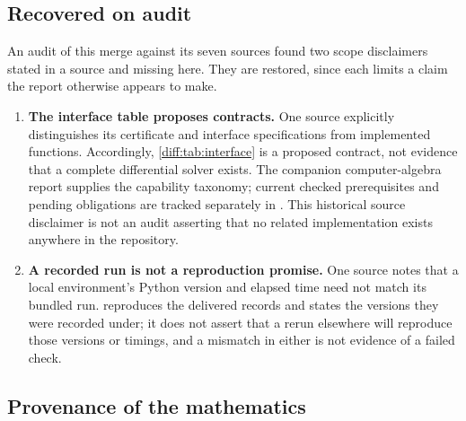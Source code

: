 \documentclass[11pt,letterpaper]{article}
\numberwithin{equation}{section}
\theoremstyle{definition}
\theoremstyle{remark}
\begin{document}
\subsection{Recovered on audit}
\label{diff:sub:nc:recovered}
An audit of this merge against its seven sources found two scope disclaimers
stated in a source and missing here.  They are restored, since each limits a
claim the report otherwise appears to make.

\begin{enumerate}[label=\textup{R\arabic*.},leftmargin=3.0em,itemsep=0.35em]
\item \textbf{The interface table proposes contracts.} One source explicitly
distinguishes its certificate and interface specifications from implemented
functions. Accordingly, \cref{diff:tab:interface} is a proposed contract, not
evidence that a complete differential solver exists. The companion
computer-algebra report supplies the capability taxonomy; current checked
prerequisites and pending obligations are tracked separately in
. This historical source disclaimer is not an
audit asserting that no related implementation exists anywhere in the repository.
\item \textbf{A recorded run is not a reproduction promise.}  One source notes
that a local environment's Python version and elapsed time need not match its
bundled run.   reproduces the delivered records
and states the versions they were recorded under; it does not assert that a
rerun elsewhere will reproduce those versions or timings, and a mismatch in
either is not evidence of a failed check.
\end{enumerate}

\subsection{Provenance of the mathematics}
\label{diff:sub:nc:provenance}
\end{document}
